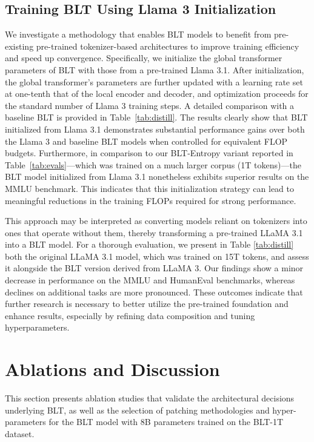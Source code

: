 \subsection{Training {\textsc BLT} Using Llama 3 Initialization}
\label{sec:distillation}
We investigate a methodology that enables {\textsc BLT} models to benefit from pre-existing pre-trained tokenizer-based architectures to improve training efficiency and speed up convergence. Specifically, we initialize the global transformer parameters of {\textsc BLT} with those from a pre-trained Llama 3.1. After initialization, the global transformer's parameters are further updated with a learning rate set at one-tenth that of the local encoder and decoder, and optimization proceeds for the standard number of Llama 3 training steps. A detailed comparison with a baseline {\textsc BLT} is provided in Table~\ref{tab:distill}. The results clearly show that {\textsc BLT} initialized from Llama 3.1 demonstrates substantial performance gains over both the Llama 3 and baseline {\textsc BLT} models when controlled for equivalent FLOP budgets. Furthermore, in comparison to our {\textsc BLT}-Entropy variant reported in Table~\ref{tab:evals}—which was trained on a much larger corpus (1T tokens)—the {\textsc BLT} model initialized from Llama 3.1 nonetheless exhibits superior results on the MMLU benchmark. This indicates that this initialization strategy can lead to meaningful reductions in the training FLOPs required for strong performance.

This approach may be interpreted as converting models reliant on tokenizers into ones that operate without them, thereby transforming a pre-trained LLaMA 3.1 into a {\textsc BLT} model. For a thorough evaluation, we present in Table \ref{tab:distill} both the original LLaMA 3.1 model, which was trained on 15T tokens, and assess it alongside the {\textsc BLT} version derived from LLaMA 3. Our findings show a minor decrease in performance on the MMLU and HumanEval benchmarks, whereas declines on additional tasks are more pronounced. These outcomes indicate that further research is necessary to better utilize the pre-trained foundation and enhance results, especially by refining data composition and tuning hyperparameters.

\section{Ablations and Discussion}
\label{section:ablations}
This section presents ablation studies that validate the architectural decisions underlying {\textsc BLT}, as well as the selection of patching methodologies and hyper-parameters for the {\textsc BLT} model with 8B parameters trained on the {\textsc BLT}-1T dataset.


